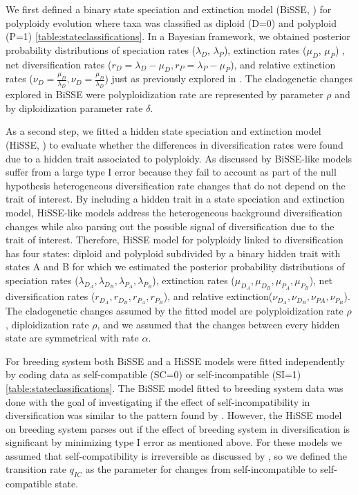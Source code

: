 We first defined a binary state speciation and extinction model (BiSSE, \citet{maddison_2007})  for polyploidy evolution where taxa was classified as diploid (D=0) and polyploid (P=1) \cref{table:stateclassifications}.
In a Bayesian framework, we obtained posterior probability distributions of speciation rates ($\lambda_D$, $\lambda_P$), extinction rates ($\mu_D$, $\mu_P$) , net diversification rates ($r_D=\lambda_D-\mu_D, r_P=\lambda_P-\mu_P$), and  relative extinction rates ($\nu_D=\frac{\mu_D}{\lambda_D}, \nu_D=\frac{\mu_D}{\lambda_D}$) just as previously explored in \citet{mayrose_2011}.
The cladogenetic changes explored in BiSSE were polyploidization rate are represented by parameter $\rho$ and by diploidization parameter rate $\delta$.

As a second step, we fitted a hidden state speciation and extinction model (HiSSE, \citet{beaulieu_2016}) to evaluate whether the differences in diversification rates were found due to a hidden trait associated to polyploidy.
As discussed by \citet{beaulieu_2016} BiSSE-like models suffer from a large type I error because they fail to account as part of the null hypothesis heterogeneous diversification rate changes  that do not depend on the trait of interest.
By including a hidden trait in a state speciation and extinction  model,  HiSSE-like models address the heterogeneous background diversification changes while also parsing out the possible signal of diversification due to the trait of interest. 
Therefore, HiSSE model for polyploidy linked to diversification has four states: diploid and polyploid subdivided by a binary hidden trait with states A and B for which we estimated the posterior probability distributions of speciation rates ($\lambda_{D_A},\lambda_{D_B}, \lambda_{P_A},\lambda_{P_B}$), extinction rates ($\mu_{D_A},\mu_{D_B}, \mu_{P_A},\mu_{P_B}$),  net diversification rates ($r_{D_A},r_{D_B},r_{P_A},r_{P_B}$), and relative extinction($\nu_{D_A},\nu_{D_B}, \nu_{PA},\nu_{P_B}$).
The cladogenetic changes assumed by the fitted model are polyploidization rate $\rho$, diploidization rate $\rho$, and we assumed that the changes between every hidden state are symmetrical with rate $\alpha$.

For breeding system both BiSSE and a HiSSE models were fitted independently by coding data as self-compatible (SC=0) or self-incompatible (SI=1) \cref{table:stateclassifications}.
The BiSSE model fitted to breeding system data was done with the goal of investigating if the effect of self-incompatibility in diversification was similar to the pattern found by \citet{goldberg_2012}.
However, the HiSSE model on breeding system parses out if the effect of breeding system in diversification is significant  by minimizing type I error as mentioned above.
For these models we assumed that self-compatibility is irreversible as discussed by \citet{igic_2013}, so we defined the transition rate $q_{IC}$ as the parameter for changes from self-incompatible to self-compatible state.

